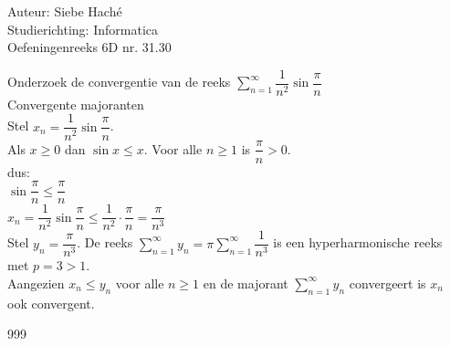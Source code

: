 \documentclass[a4paper]{article}
\begin{document}
\noindent \large Auteur: Siebe Haché \\
\noindent \large Studierichting: Informatica \\
\noindent \large Oefeningenreeks 6D nr. 31.30\\

\medskip
\normalsize

Onderzoek de convergentie van de reeks $\displaystyle\sum_{n=1}^{\infty}\dfrac{1}{n^2}\sin\dfrac{\pi}{n}$ \\

Convergente majoranten\\

Stel $x_n = \dfrac{1}{n^2} \sin\dfrac{\pi}{n}$.\\

Als $x \ge 0$ dan $\sin x \le x$. Voor alle $n \ge 1$ is $\dfrac{\pi}{n} > 0$.\\

dus:\\

$\sin\dfrac{\pi}{n} \le \dfrac{\pi}{n}$\\


$x_n = \dfrac{1}{n^2} \sin\dfrac{\pi}{n} \le \dfrac{1}{n^2} \cdot \dfrac{\pi}{n} = \dfrac{\pi}{n^3}$\\

Stel $y_n = \dfrac{\pi}{n^3}$. De reeks $\displaystyle\sum_{n=1}^{\infty} y_n = \pi \sum_{n=1}^{\infty} \dfrac{1}{n^3}$ is een hyperharmonische reeks met $p = 3 > 1$.\\

Aangezien $x_n \le y_n$ voor alle $n \ge 1$ en de majorant $\displaystyle\sum_{n=1}^{\infty} y_n$ convergeert is $x_n$ ook convergent.\\

\begin{thebibliography}{999}
\end{thebibliography}
\end{document}
